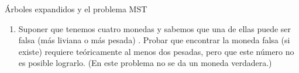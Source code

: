 \begin{section}{Árboles expandidos y el problema MST}
\begin{enumerate}
 \item Suponer que tenemos cuatro monedas y sabemos que una de ellas puede ser falsa (más liviana o más pesada) . Probar que encontrar la moneda falsa (si existe) requiere teóricamente al menos dos pesadas, pero que este número no es posible lograrlo. (En este problema no se da un moneda verdadera.)
\end{enumerate}

\end{section}

